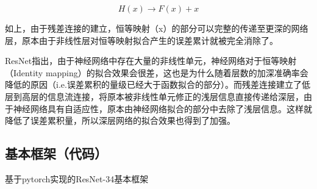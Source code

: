 \[H(x)\longrightarrow{F(x) + x}\]

如上，由于残差连接的建立，恒等映射（x）的部分可以完整的传递至更深的网络层，原本由于非线性层对恒等映射拟合产生的误差累计就被完全消除了。

ResNet指出，由于神经网络中存在大量的非线性单元，神经网络对于恒等映射（Identity
mapping）的拟合效果会很差，这也是为什么随着层数的加深准确率会降低的原因（i.e.误差累积的量级已经大于函数拟合的部分）。而残差连接建立了低层到高层的信息流连接，将原本被非线性单元修正的浅层信息直接传递给深层，由于神经网络具有自适应性，原本由神经网络拟合的部分中去除了浅层信息。这样就降低了误差累积量，所以深层网络的拟合效果也得到了加强。

\subsection{基本框架（代码）}\label{ux57faux672cux6846ux67b6ux4ee3ux7801}

基于pytorch实现的ResNet-34基本框架


